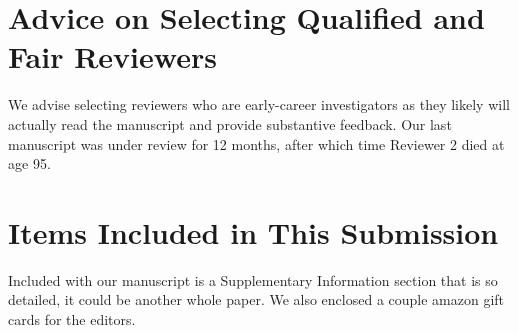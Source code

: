 \documentclass[11pt]{article}
\begin{document}
\section{Advice on Selecting Qualified and Fair Reviewers}
\noindent We advise selecting reviewers who are early-career investigators as they likely will actually read the manuscript and provide substantive feedback. Our last manuscript was under review for 12 months, after which time Reviewer 2 died at age 95.


\section{Items Included in This Submission}
\noindent Included with our manuscript is a Supplementary Information section that is so detailed, it could be another whole paper. We also enclosed a couple amazon gift cards for the editors. 

%

\end{document}
